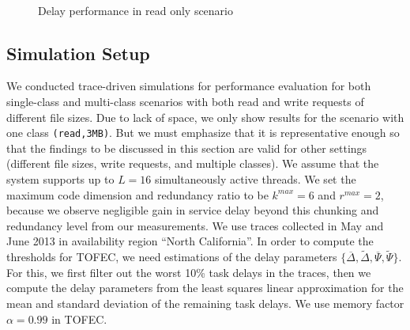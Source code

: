 \documentclass[journal]{IEEEtran}
\newcommand{\ourproposal}{TOFEC\xspace}
\newcommand{\fixedDelta}{\overline{\Delta}}
\newcommand{\linearDelta}{\widetilde{\Delta}}
\newcommand{\fixedExp}{\overline{\Psi}}
\newcommand{\linearExp}{\widetilde{\Psi}}
\newcommand{\onewidth}{0.74\columnwidth}
\begin{document}
\begin{figure*}[!t]
\centering
\null\hfill
	\hfill
\hfill\null
\\
\null\hfill
\hfill
\hfill\null
\caption{Delay performance in read only scenario}
\label{fig:read}
\end{figure*}
\subsection{Simulation Setup}
\label{ssec:eva:setup}

We conducted trace-driven simulations for performance evaluation for both single-class and multi-class scenarios with both read and write requests of different file sizes. 
Due to lack of space, we only show results for the scenario with one class {\tt (read,3MB)}. But we must emphasize that it is representative enough so that the findings to be discussed in this section are valid for other settings (different file sizes, write requests, and multiple classes). 
We assume that the system supports up to $L=16$ simultaneously active threads. 
We set the maximum code dimension and redundancy ratio to be $k^{max} = 6$ and $r^{max} = 2$, because we observe negligible gain in service delay beyond this chunking and redundancy level from our measurements. 
We use traces collected in May and June 2013 in availability region ``North California''. In order to compute the thresholds for \ourproposal, we need estimations of the delay parameters $\{\fixedDelta,\linearDelta,\fixedExp,\linearExp\}$. For this, we first filter out the worst 10\% task delays in the traces, then we compute the delay parameters from the least squares linear approximation for the mean and standard deviation of the remaining task delays. We use memory factor $\alpha = 0.99$ in \ourproposal.
\end{document}
